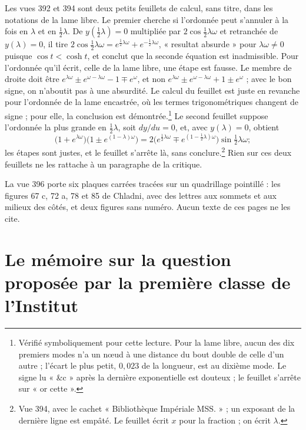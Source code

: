 \documentclass[11pt,a4paper]{article}
\begin{document}
Les vues 392 et 394 sont deux petits feuillets de calcul, sans titre, dans les notations de la lame libre. Le premier cherche si l'ordonnée peut s'annuler à la fois en $\lambda$ et en $\frac12\lambda$. De $y(\frac12\lambda)=0$ multipliée par $2\cos\frac12\lambda\omega$ et retranchée de $y(\lambda)=0$, il tire $2\cos\frac12\lambda\omega=e^{\frac12\lambda\omega}+e^{-\frac12\lambda\omega}$, « resultat absurde » pour $\lambda\omega\neq0$ puisque $\cos t<\cosh t$, et conclut que la seconde équation est inadmissible. Pour l'ordonnée qu'il écrit, celle de la lame libre, une étape est fausse. Le membre de droite doit être $e^{\lambda\omega}\pm e^{\omega-\lambda\omega}-1\mp e^{\omega}$, et non $e^{\lambda\omega}\pm e^{\omega-\lambda\omega}+1\pm e^{\omega}$ ; avec le bon signe, on n'aboutit pas à une absurdité. Le calcul du feuillet est juste en revanche pour l'ordonnée de la lame encastrée, où les termes trigonométriques changent de signe ; pour elle, la conclusion est démontrée.\footnote{Vérifié symboliquement pour cette lecture. Pour la lame libre, aucun des dix premiers modes n'a un nœud à une distance du bout double de celle d'un autre ; l'écart le plus petit, $0{,}023$ de la longueur, est au dixième mode. Le signe lu « \&c » après la dernière exponentielle est douteux ; le feuillet s'arrête sur « or cette ».} Le second feuillet suppose l'ordonnée la plus grande en $\frac12\lambda$, soit $dy/du=0$, et, avec $y(\lambda)=0$, obtient
\[
\bigl(1+e^{\lambda\omega}\bigr)\bigl(1\pm e^{(1-\lambda)\omega}\bigr)=2\bigl(e^{\frac12\lambda\omega}\mp e^{(1-\frac12\lambda)\omega}\bigr)\sin\tfrac12\lambda\omega ;
\]
les étapes sont justes, et le feuillet s'arrête là, sans conclure.\footnote{Vue 394, avec le cachet « Bibliothèque Impériale MSS. » ; un exposant de la dernière ligne est empâté. Le feuillet écrit $x$ pour la fraction ; on écrit $\lambda$.} Rien sur ces deux feuillets ne les rattache à un paragraphe de la critique.

La vue 396 porte six plaques carrées tracées sur un quadrillage pointillé : les figures 67 c, 72 a, 78 et 85 de Chladni, avec des lettres aux sommets et aux milieux des côtés, et deux figures sans numéro. Aucun texte de ces pages ne les cite.

\section*{Le mémoire sur la question proposée par la première classe de l'Institut}
\end{document}
